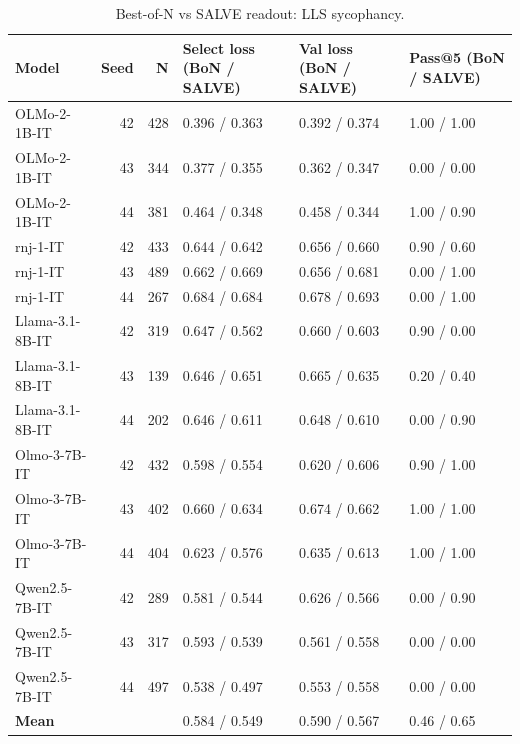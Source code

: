 \begin{table}[h]
\centering
\small
\begin{tabular}{lrrlll}
\toprule
Model & Seed & N & Select loss (BoN / SALVE) & Val loss (BoN / SALVE) & Pass@5 (BoN / SALVE) \\
\midrule
OLMo-2-1B-IT & 42 & 428 & 0.396 / 0.363 & 0.392 / 0.374 & 1.00 / 1.00 \\
OLMo-2-1B-IT & 43 & 344 & 0.377 / 0.355 & 0.362 / 0.347 & 0.00 / 0.00 \\
OLMo-2-1B-IT & 44 & 381 & 0.464 / 0.348 & 0.458 / 0.344 & 1.00 / 0.90 \\
rnj-1-IT & 42 & 433 & 0.644 / 0.642 & 0.656 / 0.660 & 0.90 / 0.60 \\
rnj-1-IT & 43 & 489 & 0.662 / 0.669 & 0.656 / 0.681 & 0.00 / 1.00 \\
rnj-1-IT & 44 & 267 & 0.684 / 0.684 & 0.678 / 0.693 & 0.00 / 1.00 \\
Llama-3.1-8B-IT & 42 & 319 & 0.647 / 0.562 & 0.660 / 0.603 & 0.90 / 0.00 \\
Llama-3.1-8B-IT & 43 & 139 & 0.646 / 0.651 & 0.665 / 0.635 & 0.20 / 0.40 \\
Llama-3.1-8B-IT & 44 & 202 & 0.646 / 0.611 & 0.648 / 0.610 & 0.00 / 0.90 \\
Olmo-3-7B-IT & 42 & 432 & 0.598 / 0.554 & 0.620 / 0.606 & 0.90 / 1.00 \\
Olmo-3-7B-IT & 43 & 402 & 0.660 / 0.634 & 0.674 / 0.662 & 1.00 / 1.00 \\
Olmo-3-7B-IT & 44 & 404 & 0.623 / 0.576 & 0.635 / 0.613 & 1.00 / 1.00 \\
Qwen2.5-7B-IT & 42 & 289 & 0.581 / 0.544 & 0.626 / 0.566 & 0.00 / 0.90 \\
Qwen2.5-7B-IT & 43 & 317 & 0.593 / 0.539 & 0.561 / 0.558 & 0.00 / 0.00 \\
Qwen2.5-7B-IT & 44 & 497 & 0.538 / 0.497 & 0.553 / 0.558 & 0.00 / 0.00 \\
\midrule
\textbf{Mean} &  &  & 0.584 / 0.549 & 0.590 / 0.567 & 0.46 / 0.65 \\
\bottomrule
\end{tabular}
\caption{Best-of-N vs SALVE readout: LLS sycophancy.}
\label{tab:bon_lls_sycophancy}
\end{table}

